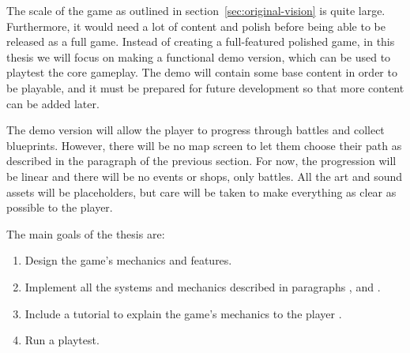 The scale of the game as outlined in section~\ref{sec:original-vision} is quite large.
Furthermore, it would need a lot of content and polish before being able to be released as a full game.
Instead of creating a full-featured polished game, in this thesis we will focus on making a functional demo version, which can be used to playtest the core gameplay.
The demo will contain some base content in order to be playable, and it must be prepared for future development so that more content can be added later.

The demo version will allow the player to progress through battles and collect blueprints.
However, there will be no map screen to let them choose their path as described in the paragraph  of the previous section.
For now, the progression will be linear and there will be no events or shops, only battles.
All the art and sound assets will be placeholders, but care will be taken to make everything as clear as possible to the player.

\hfill\break
The main goals of the thesis are:
\begin{enumerate}
    \item Design the game's mechanics and features.
    \item Implement all the systems and mechanics described in paragraphs ,  and .
    \item Include a tutorial to explain the game's mechanics to the player .
    \item Run a playtest.
\end{enumerate}
